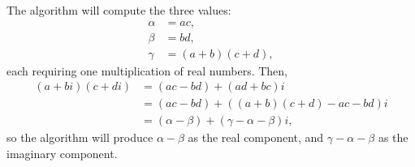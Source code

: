 The algorithm will compute the three values:
\begin{align*}
    \alpha &= ac, \\
    \beta &= bd, \\
    \gamma &= (a+b)(c+d),
\end{align*}
each requiring one multiplication of real numbers.
Then,
\begin{align*}
    (a+bi)(c+di) &= (ac-bd)+(ad+bc)i \\
    &= (ac-bd)+((a+b)(c+d)-ac-bd)i \\
    &= (\alpha-\beta)+(\gamma-\alpha-\beta)i,
\end{align*}
so the algorithm will produce $\alpha-\beta$ as the real component, and $\gamma-\alpha-\beta$ as the imaginary component.
